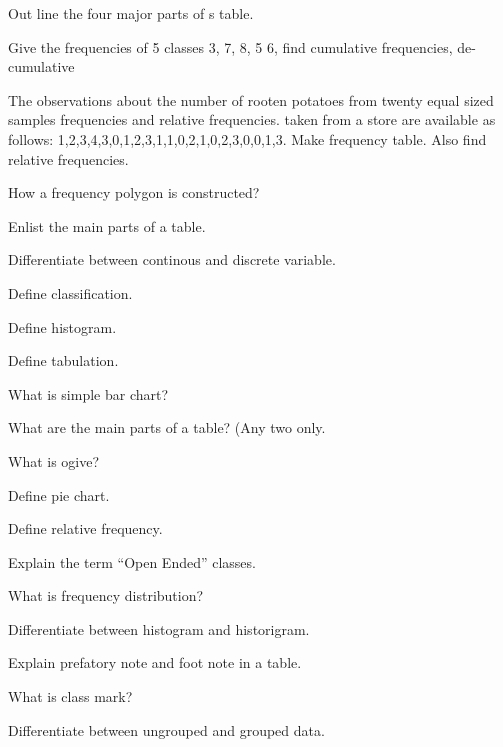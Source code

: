 \documentclass[11pt,a4paper]{article}
\begin{document}
\begin{shortlist}
\item Out line the four major parts of s table.

\item Give the frequencies of 5 classes 3, 7, 8, 5 6, find cumulative frequencies, de-cumulative

\item The observations about the number of rooten potatoes from twenty equal sized samples frequencies and relative frequencies. taken from a store are available as follows: 1,2,3,4,3,0,1,2,3,1,1,0,2,1,0,2,3,0,0,1,3. Make frequency table. Also find relative frequencies.

\item How a frequency polygon is constructed?

\item Enlist the main parts of a table.

\item Differentiate between continous and discrete variable.

\item Define classification.

\item Define histogram.

\item Define tabulation.

\item What is simple bar chart?

\item What are the main parts of a table? (Any two only.

\item What is ogive?

\item Define pie chart.

\item Define relative frequency.

\item Explain the term “Open Ended” classes.

\item What is frequency distribution?

\item Differentiate between histogram and historigram.

\item Explain prefatory note and foot note in a table.

\item What is class mark?

\item Differentiate between ungrouped and grouped data.


\end{shortlist}
\end{document}
